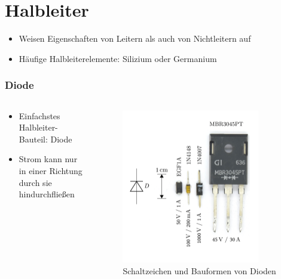 
\section{Halbleiter}
\label{section:halbleiter}
\begin{frame}%
\begin{itemize}
  \item Weisen Eigenschaften von Leitern als auch von Nichtleitern auf
  \item Häufige Halbleiterelemente: Silizium oder Germanium
  \end{itemize}

\end{frame}

\begin{frame}
\frametitle{Diode}
\begin{columns}
    \begin{column}{0.48\textwidth}
    \begin{itemize}
  \item Einfachstes Halbleiter-Bauteil: Diode
  \item Strom kann nur in einer Richtung durch sie hindurchfließen
  \end{itemize}

    \end{column}
   \begin{column}{0.48\textwidth}
       
\begin{figure}
    \includegraphics[width=0.85\textwidth]{foto/204}
    \caption{\scriptsize Schaltzeichen und Bauformen von Dioden}
    \label{n_halbleiter_dioden}
\end{figure}

   \end{column}
\end{columns}

\end{frame}

